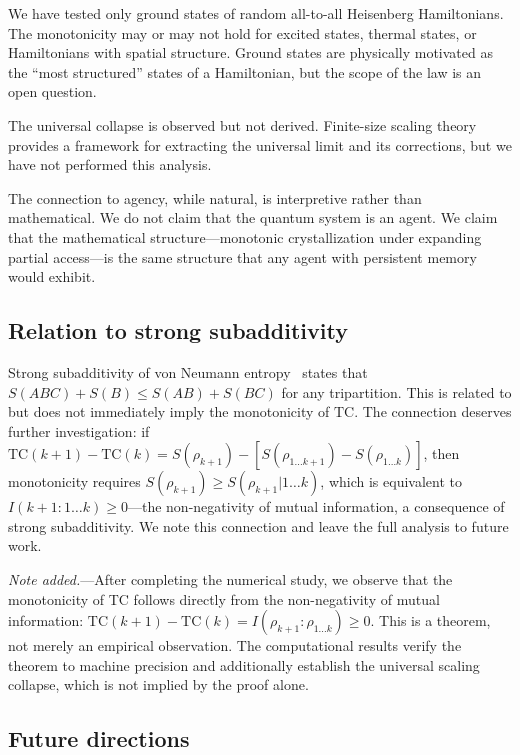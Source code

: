 \documentclass[aps,pra,twocolumn,superscriptaddress,floatfix]{revtex4-2}
\begin{document}
We have tested only ground states of random all-to-all Heisenberg Hamiltonians.
The monotonicity may or may not hold for excited states, thermal states, or Hamiltonians with spatial structure.
Ground states are physically motivated as the ``most structured'' states of a Hamiltonian, but the scope of the law is an open question.

The universal collapse is observed but not derived.
Finite-size scaling theory~\cite{fisher1972} provides a framework for extracting the universal limit and its corrections, but we have not performed this analysis.

The connection to agency, while natural, is interpretive rather than mathematical.
We do not claim that the quantum system is an agent.
We claim that the mathematical structure---monotonic crystallization under expanding partial access---is the same structure that any agent with persistent memory would exhibit.

\subsection{Relation to strong subadditivity}

Strong subadditivity of von Neumann entropy~\cite{lieb1973b} states that $S(ABC) + S(B) \leq S(AB) + S(BC)$ for any tripartition.
This is related to but does not immediately imply the monotonicity of $\mathrm{TC}$.
The connection deserves further investigation: if $\mathrm{TC}(k+1) - \mathrm{TC}(k) = S(\rho_{k+1}) - [S(\rho_{1\ldots k+1}) - S(\rho_{1\ldots k})]$, then monotonicity requires $S(\rho_{k+1}) \geq S(\rho_{k+1}|1\ldots k)$, which is equivalent to $I(k{+}1 : 1{\ldots}k) \geq 0$---the non-negativity of mutual information, a consequence of strong subadditivity.
We note this connection and leave the full analysis to future work.

\emph{Note added.}---After completing the numerical study, we observe that the monotonicity of TC follows directly from the non-negativity of mutual information: $\mathrm{TC}(k+1) - \mathrm{TC}(k) = I(\rho_{k+1} : \rho_{1\ldots k}) \geq 0$. This is a theorem, not merely an empirical observation. The computational results verify the theorem to machine precision and additionally establish the universal scaling collapse, which is not implied by the proof alone.

\subsection{Future directions}
\end{document}
